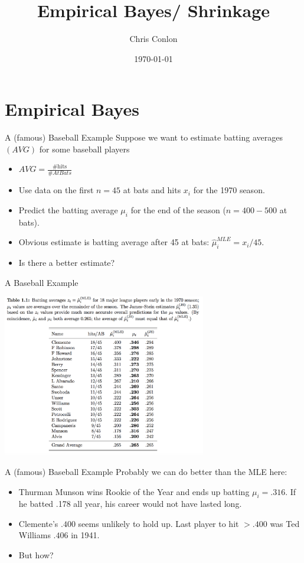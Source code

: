 \documentclass[xcolor=pdftex,dvipsnames,table,mathserif,aspectratio=169]{beamer}
\title{ Empirical Bayes/ Shrinkage}
\author{Chris Conlon }
\institute{NYU Stern }
\date{\today}
\begin{document}
\maketitle
\section{Empirical Bayes}



\begin{frame}[fragile]{A (famous) Baseball Example}
Suppose we want to estimate batting averages $(AVG)$ for some baseball players
\begin{itemize}
\item $AVG = \frac{\# \text{hits}}{ \# At Bats}$
\item Use data on the first $n=45$ at bats and hits $x_i$ for the 1970 season.
\item Predict the batting average $\mu_i$ for the end of the season  ($n=400-500$ at bats).
\item Obvious estimate is batting average after 45 at bats: $\widehat{\mu}_i^{MLE}= x_i/45$.
\item Is there a better estimate?
\end{itemize}
\end{frame}


\begin{frame}[fragile]{A Baseball Example}
\begin{center}
\includegraphics[width=3.5in]{./resources/baseball.png}
\end{center}
\end{frame}

\begin{frame}[fragile]{A (famous) Baseball Example}
Probably we can do better than the MLE here:
\begin{itemize}
\item Thurman Munson wins Rookie of the Year and ends up batting $\mu_i = .316$. If he batted .178 all year, his career would not have lasted long.
\item Clemente's $.400$ seems unlikely to hold up. Last player to hit $> .400$ was Ted Williams $.406$ in 1941.
\item But how?
\end{itemize}
\end{frame}
\end{document}
